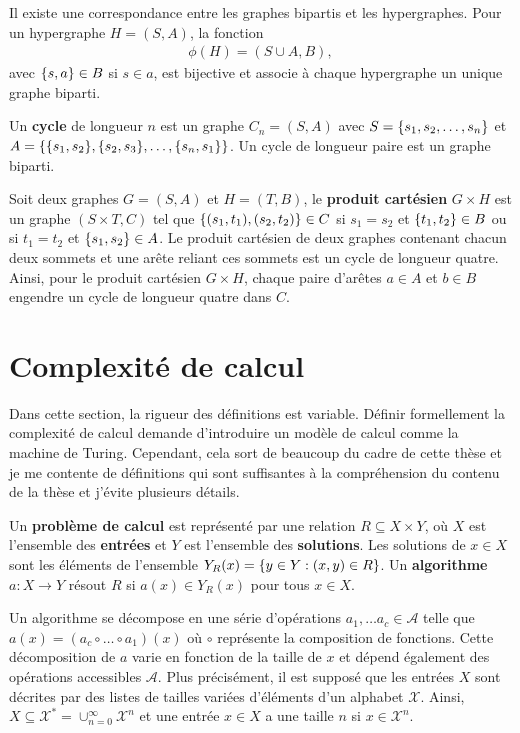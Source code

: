 Il existe une correspondance entre les graphes bipartis et les hypergraphes.
Pour un hypergraphe $H = (S, A)$,
la fonction 
\begin{align}
  \phi(H) = (S \cup A, B),
\end{align}
avec $\qty{s, a} \in B$ si $s \in a$,
est bijective et associe à chaque hypergraphe un unique graphe biparti.

Un \textbf{cycle} de longueur $n$ est un graphe $C_n = (S, A)$
avec $S = \qty{s_1, s_2, \ldots, s_n}$ et 
$A = \qty{\qty{s_1, s_2}, \qty{s_2, s_3}, \ldots, \qty{s_n, s_1}}$.
Un cycle de longueur paire est un graphe biparti.

Soit deux graphes $G = (S, A)$ et $H = (T, B)$,
le \textbf{produit cartésien} $G \times H$ est un graphe $(S \times T, C)$
tel que $\qty{(s_1, t_1), (s_2, t_2)} \in C$ si 
$s_1 = s_2$ et $\qty{t_1, t_2} \in B$ ou si $t_1 = t_2$ et $\qty{s_1, s_2} \in A$.
Le produit cartésien de deux graphes contenant chacun deux sommets et une arête reliant ces
sommets est un cycle de longueur quatre.
Ainsi,
pour le produit cartésien $G \times H$,
chaque paire d'arêtes $a \in A$ et $b \in B$ engendre un cycle de longueur quatre dans $C$.

\chapter{Complexité de calcul}
\label{chap:complexite_calcul}

Dans cette section,
la rigueur des définitions est variable.
Définir formellement la complexité de calcul demande d'introduire un modèle de 
calcul comme la machine de Turing.
Cependant,
cela sort de beaucoup du cadre de cette thèse
et je me contente de définitions qui sont suffisantes à la compréhension du contenu de la thèse
et j'évite plusieurs détails.

Un \textbf{problème de calcul} est représenté par une relation $R \subseteq X \times Y$, 
où $X$ est l'ensemble des \textbf{entrées} et $Y$ est l'ensemble des \textbf{solutions}.
Les solutions de $x \in X$ sont les éléments de l'ensemble $Y_R(x) = \qty{y \in Y : (x, y)\in R}$.
Un \textbf{algorithme} $a: X \to Y$ résout $R$ si $a(x) \in Y_R(x)$ pour tous $x \in X$.

Un algorithme se décompose en une série d'opérations $a_1, \ldots a_c \in \mathcal A$ telle
que $a(x) = (a_c \circ \ldots \circ a_1)(x)$ où $\circ$ représente la composition
de fonctions.
Cette décomposition de $a$ varie en fonction de la taille de $x$
et dépend également des opérations accessibles $\mathcal A$.
Plus précisément,
il est supposé que les entrées $X$ sont décrites par des listes de tailles variées
d'éléments d'un alphabet $\mathcal X$.
Ainsi,
$X \subseteq \mathcal X^* = \cup_{n=0}^\infty \mathcal X^n$ et
une entrée $x \in X$ a une taille $n$ si $x \in \mathcal X^n$.

